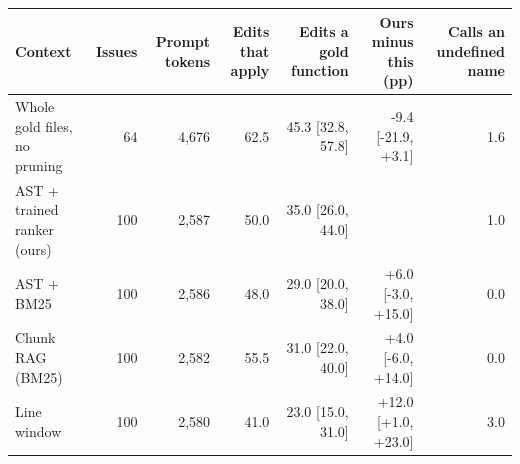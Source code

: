 \begin{tabular}{lrrrrrr}
\toprule
Context & Issues & Prompt tokens & Edits that apply & Edits a gold function & Ours minus this (pp) & Calls an undefined name \\
\midrule
Whole gold files, no pruning & 64 & 4,676 & 62.5 & 45.3 [32.8, 57.8] & -9.4 [-21.9, +3.1] & 1.6 \\
AST + trained ranker (ours) & 100 & 2,587 & 50.0 & 35.0 [26.0, 44.0] &  & 1.0 \\
AST + BM25 & 100 & 2,586 & 48.0 & 29.0 [20.0, 38.0] & +6.0 [-3.0, +15.0] & 0.0 \\
Chunk RAG (BM25) & 100 & 2,582 & 55.5 & 31.0 [22.0, 40.0] & +4.0 [-6.0, +14.0] & 0.0 \\
Line window & 100 & 2,580 & 41.0 & 23.0 [15.0, 31.0] & +12.0 [+1.0, +23.0] & 3.0 \\
\bottomrule
\end{tabular}
